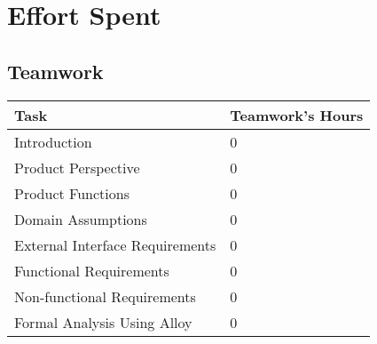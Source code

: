\section{Effort Spent}

\subsection{Teamwork}
\vspace{2mm}
\begin{center}
	\begin{tabular}{| l | p{} |}
		\hline
		\textbf{Task} & \textbf{Teamwork's Hours} \\ \hline
		Introduction & 0 \\ \hline
		Product Perspective & 0 \\ \hline
		Product Functions & 0 \\ \hline
		Domain Assumptions & 0 \\ \hline
		External Interface Requirements & 0 \\ \hline
		Functional Requirements & 0 \\ \hline
		Non-functional Requirements & 0 \\ \hline
		Formal Analysis Using Alloy & 0 \\
		\hline	
	\end{tabular}
\end{center}

